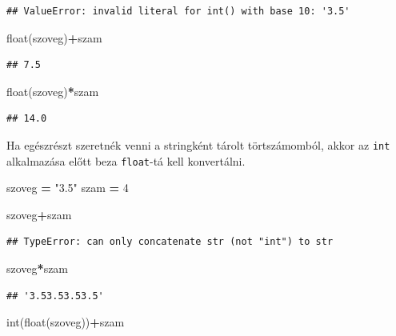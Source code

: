 \documentclass[
]{book}
\newenvironment{Shaded}{\begin{snugshade}}{\end{snugshade}}
\newcommand{\BuiltInTok}[1]{#1}
\newcommand{\DecValTok}[1]{\textcolor[rgb]{0.00,0.00,0.81}{#1}}
\newcommand{\NormalTok}[1]{#1}
\newcommand{\OperatorTok}[1]{\textcolor[rgb]{0.81,0.36,0.00}{\textbf{#1}}}
\newcommand{\StringTok}[1]{\textcolor[rgb]{0.31,0.60,0.02}{#1}}
\begin{document}
\begin{verbatim}
## ValueError: invalid literal for int() with base 10: '3.5'
\end{verbatim}

\begin{Shaded}
\begin{Highlighting}[]
\BuiltInTok{float}\NormalTok{(szoveg)}\OperatorTok{+}\NormalTok{szam}
\end{Highlighting}
\end{Shaded}

\begin{verbatim}
## 7.5
\end{verbatim}

\begin{Shaded}
\begin{Highlighting}[]
\BuiltInTok{float}\NormalTok{(szoveg)}\OperatorTok{*}\NormalTok{szam}
\end{Highlighting}
\end{Shaded}

\begin{verbatim}
## 14.0
\end{verbatim}

Ha egészrészt szeretnék venni a stringként tárolt törtszámomból, akkor az \texttt{int} alkalmazása előtt beza \texttt{float}-tá kell konvertálni.

\begin{Shaded}
\begin{Highlighting}[]
\NormalTok{szoveg }\OperatorTok{=} \StringTok{"3.5"}
\NormalTok{szam }\OperatorTok{=} \DecValTok{4}

\NormalTok{szoveg}\OperatorTok{+}\NormalTok{szam}
\end{Highlighting}
\end{Shaded}

\begin{verbatim}
## TypeError: can only concatenate str (not "int") to str
\end{verbatim}

\begin{Shaded}
\begin{Highlighting}[]
\NormalTok{szoveg}\OperatorTok{*}\NormalTok{szam}
\end{Highlighting}
\end{Shaded}

\begin{verbatim}
## '3.53.53.53.5'
\end{verbatim}

\begin{Shaded}
\begin{Highlighting}[]
\BuiltInTok{int}\NormalTok{(}\BuiltInTok{float}\NormalTok{(szoveg))}\OperatorTok{+}\NormalTok{szam}
\end{Highlighting}
\end{Shaded}
\end{document}
